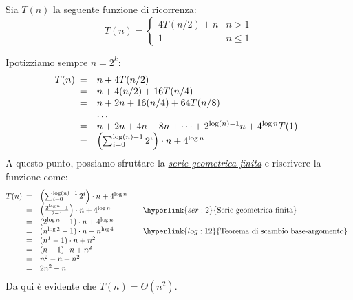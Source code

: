 \begin{eg}
    Sia $T(n)$ la seguente funzione di ricorrenza:
    \[T(n)=\begin{cases}
        4T(n/2)+n & n>1\\
        1 & n\leq1
    \end{cases}\]

    \newpage\noindent
    Ipotizziamo sempre $n=2^k$:
    \[T(n)\begin{array}[t]{cl}
        = & n + 4T(n/2)\\
        = & n + 4(n/2) + 16T(n/4)\\
        = & n + 2n + 16(n/4) + 64T(n/8)\\
        = & \dots\\
        = & n + 2n + 4n + 8n + \dots + 2^{\log(n)-1}n + 4^{\log n}T(1)\\
        = & \left(\sum_{i=0}^{\log(n)-1}2^i\right)\cdot n+4^{\log n}
    \end{array}\]
    A questo punto, possiamo sfruttare la \hyperlink{ser:2}{\emph{serie geometrica
    finita}} e riscrivere la funzione come:
    \[T(n)\begin{array}[t]{cll}
        = & \left(\sum_{i=0}^{\log(n)-1}2^i\right)\cdot n+4^{\log n}\\
        = & \left(\frac{2^{\log n}-1}{2 - 1}\right)\cdot n + 4^{\log n} & \quad\hyperlink{ser:2}{\text{Serie geometrica finita}}\\
        = & (2^{\log n}-1)\cdot n+4^{\log n}\\
        = & (n^{\log 2}-1)\cdot n+n^{\log 4} & \quad\hyperlink{log:12}{\text{Teorema di scambio base-argomento}}\\
        = & (n^1-1)\cdot n+n^2\\
        = & (n-1)\cdot n+n^2\\
        = & n^2 - n + n^2\\
        = & 2n^2 - n
    \end{array}\]
    Da qui è evidente che $T(n)=\Theta(n^2)$.
\end{eg}

